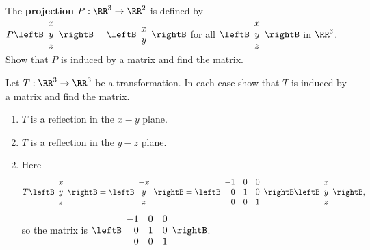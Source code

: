 \begin{multicols}{2}
\begin{ex}
The \textbf{projection} $P : \RR^3 \to \RR^2$ is defined by $P \leftB \begin{array}{c}
x \\
y \\
z
\end{array} \rightB = \leftB \begin{array}{c}
x \\
y
\end{array} \rightB$
 for all $\leftB \begin{array}{c}
 x \\
 y \\
 z
 \end{array} \rightB$
 in $\RR^3$. Show that $P$ is induced by a matrix and find the matrix.
\end{ex}

\begin{ex}
Let $T : \RR^3 \to \RR^3$
 be a transformation. In each case show that $T$ is induced by a matrix and find the matrix.


\begin{enumerate}[label={\alph*.}]
\item $T$ is a reflection in the $x-y$ plane.

\item $T$ is a reflection in the $y-z$ plane.

\end{enumerate}
\begin{sol}
\begin{enumerate}[label={\alph*.}]
\setcounter{enumi}{1}
\item  Here 
\begin{equation*}
T \leftB \begin{array}{c}
x \\
y \\
z
\end{array} \rightB = \leftB \begin{array}{c}
-x \\
y \\
z
\end{array} \rightB = \leftB \begin{array}{rrr}
-1 & 0 & 0 \\
0 & 1 & 0 \\
0 & 0 & 1
\end{array} \rightB \leftB \begin{array}{c}
x \\
y \\
z
\end{array} \rightB,
\end{equation*}
 so the matrix is $\leftB \begin{array}{rrr}
-1 & 0 & 0 \\
0 & 1 & 0 \\
0 & 0 & 1
\end{array} \rightB$.



\end{enumerate}
\end{sol}
\end{ex}
\end{multicols}
